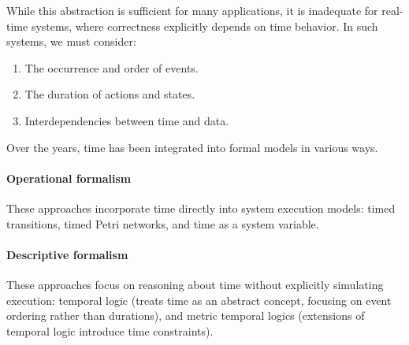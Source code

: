 While this abstraction is sufficient for many applications, it is inadequate for real-time systems, where correctness explicitly depends on time behavior. 
In such systems, we must consider:
\begin{enumerate}
    \item The occurrence and order of events.
    \item The duration of actions and states.
    \item Interdependencies between time and data.
\end{enumerate}
Over the years, time has been integrated into formal models in various ways.

\paragraph*{Operational formalism}
These approaches incorporate time directly into system execution models: timed transitions, timed Petri networks, and time as a system variable. 

\paragraph*{Descriptive formalism}
These approaches focus on reasoning about time without explicitly simulating execution: temporal logic (treats time as an abstract concept, focusing on event ordering rather than durations), and metric temporal logics (extensions of temporal logic introduce time constraints).